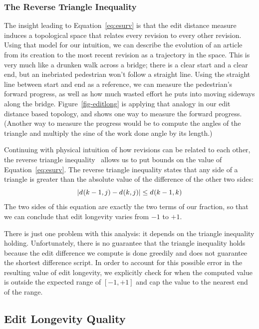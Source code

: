 \subsubsection{The Reverse Triangle Inequality}

The insight leading to Equation~\ref{eq:esurv} is that the edit distance
measure induces a topological space that relates every revision to
every other revision.
Using that model for our intuition, we can describe the evolution of
an article from its creation to the most recent revision as a trajectory
in the space.
This is very much like a drunken walk across a bridge;
there is a clear start and a clear end, but an inebriated
pedestrian won't follow a straight line.
Using the straight line between start and end as a reference,
we can measure the pedestrian's forward progress, as well as
how much wasted effort he puts into moving sideways along the bridge.
Figure~\ref{fig-editlong} is applying that analogy in our
edit distance based topology, and shows one way to measure
the forward progress.
(Another way to measure the progress would be to compute the
angles of the triangle and multiply the sine of the
work done angle by its length.)

Continuing with physical intuition of how revisions can be
related to each other, the reverse triangle
inequality~\cite{wiki:TriangleInequality} allows us to put bounds
on the value of Equation~\ref{eq:esurv}.
The reverse triangle inequality states that any side of
a triangle is greater than the absolute value of the difference
of the other two sides:
\begin{equation}
| d_{}(k-1,j) - d_{}(k,j) | \le d_{}(k-1,k)
\end{equation}
The two sides of this equation are exactly the two terms
of our fraction, so that we can conclude that edit longevity
varies from $-1$ to $+1$.

There is just one problem with this analysis: it depends on
the triangle inequality holding.
Unfortunately, there is no guarantee that the triangle inequality
holds because the edit difference we compute is done greedily
and does not guarantee the shortest difference script.
In order to account for this possible error in the resulting
value of edit longevity, we explicitly check for when the
computed value is outside the expected range of $[-1, +1]$
and cap the value to the nearest end of the range.


\subsection{Edit Longevity Quality}

